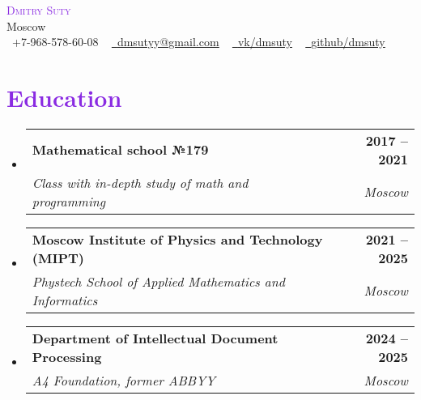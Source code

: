 \documentclass[letterpaper,11pt]{article}
\makeatletter
\newcommand{\resumeSubheading}[4]{
  \vspace{-2pt}\item
    \begin{tabular*}{1.0\textwidth}[t]{l@{\extracolsep{\fill}}r}
      \textbf{#1} & \textbf{\small #2} \\
      \textit{\small#3} & \textit{\small #4} \\
    \end{tabular*}\vspace{-7pt}
}
\newcommand{\resumeSubHeadingListStart}{\begin{itemize}[leftmargin=0.0in, label={}]}
\newcommand{\resumeSubHeadingListEnd}{\end{itemize}}
\makeatother
\begin{document}

\begin{center}
    \textcolor{BlueViolet}{\Huge \scshape Dmitry Suty} \\ \vspace{1pt}
    Moscow\\ \vspace{1pt}
    \small \raisebox{-0.1\height}\faPhone\ +7-968-578-60-08 ~ \href{mailto:dmsutyy@gmail.com}{\raisebox{-0.2\height}\faEnvelope\  \underline{dmsutyy@gmail.com}} ~ 
    \href{https://vk.com/dmsuty}{\raisebox{-0.2\height}\faVk\ \underline{vk/dmsuty}}  ~
    \href{https://github.com/}{\raisebox{-0.2\height}\faGithub\ \underline{github/dmsuty}}
    \vspace{-8pt}
\end{center}


\section{\textcolor{BlueViolet}{Education}}
  \resumeSubHeadingListStart
    \resumeSubheading
      {Mathematical school №179}{2017 -- 2021}
      {Class with in-depth study of math and programming}{Moscow}
    \resumeSubheading
      {Moscow Institute of Physics and Technology (MIPT)}{2021 -- 2025}
      {Phystech School of Applied Mathematics and Informatics}{Moscow}
    \resumeSubheading
      {Department of Intellectual Document Processing}{2024 -- 2025}
      {A4 Foundation, former ABBYY}{Moscow}
  \resumeSubHeadingListEnd
  

\end{document}
